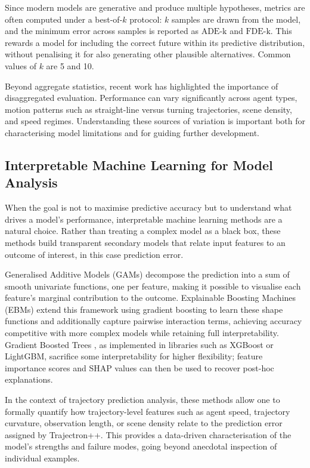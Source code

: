 \documentclass[12pt]{article}
\begin{document}
Since modern models are generative and produce multiple hypotheses, metrics are often computed under a best-of-$k$ protocol: $k$ samples are drawn from the model, and the minimum error across samples is reported as $\text{ADE-k}$ and $\text{FDE-k}$. This rewards a model for including the correct future within its predictive distribution, without penalising it for also generating other plausible alternatives. Common values of $k$ are 5 and 10.
 
Beyond aggregate statistics, recent work has highlighted the importance of disaggregated evaluation. Performance can vary significantly across agent types, motion patterns such as straight-line versus turning trajectories, scene density, and speed regimes. Understanding these sources of variation is important both for characterising model limitations and for guiding further development.
 
\subsection{Interpretable Machine Learning for Model Analysis}
 
When the goal is not to maximise predictive accuracy but to understand what drives a model's performance, interpretable machine learning methods are a natural choice. Rather than treating a complex model as a black box, these methods build transparent secondary models that relate input features to an outcome of interest, in this case prediction error.
 
Generalised Additive Models (GAMs) \citep{hastie1990gam} decompose the prediction into a sum of smooth univariate functions, one per feature, making it possible to visualise each feature's marginal contribution to the outcome. Explainable Boosting Machines (EBMs) \citep{lou2013ebm, nori2019ebm} extend this framework using gradient boosting to learn these shape functions and additionally capture pairwise interaction terms, achieving accuracy competitive with more complex models while retaining full interpretability. Gradient Boosted Trees \citep{friedman2001gbm}, as implemented in libraries such as XGBoost or LightGBM, sacrifice some interpretability for higher flexibility; feature importance scores and SHAP values \citep{lundberg2017shap} can then be used to recover post-hoc explanations.
 
In the context of trajectory prediction analysis, these methods allow one to formally quantify how trajectory-level features such as agent speed, trajectory curvature, observation length, or scene density relate to the prediction error assigned by Trajectron++. This provides a data-driven characterisation of the model's strengths and failure modes, going beyond anecdotal inspection of individual examples.
 
\end{document}
